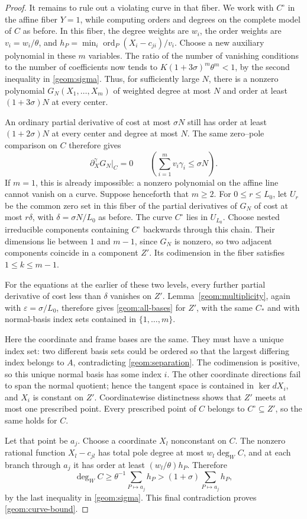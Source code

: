 \begin{proof}
It remains to rule out a violating curve in that fiber. We work with
$C^\circ$ in the affine fiber $Y=1$, while computing orders and degrees
on the complete model of $C$ as before. In this fiber, the degree weights
are $w_i$, the order weights are $v_i=w_i/\theta$,
and $h_P=\min_i\operatorname{ord}_P(X_i-c_{ji})/v_i$.
Choose a new auxiliary polynomial in these $m$ variables. The ratio of
the number of vanishing conditions to the number of coefficients now
tends to $K(1+3\sigma)^m\theta^m<1$, by the second inequality
in \eqref{geom:sigma}. Thus, for sufficiently large $N$, there is a
nonzero polynomial $G_N(X_1,\ldots,X_m)$ of weighted degree at most $N$
and order at least $(1+3\sigma)N$ at every center.

An ordinary partial derivative of cost at most $\sigma N$ still has
order at least $(1+2\sigma)N$ at every center and degree at most $N$.
The same zero--pole comparison on $C$ therefore gives
\[
 \partial_X^\gamma G_N\big|_C=0
 \qquad\left(\sum_{i=1}^m v_i\gamma_i\le\sigma N\right).
\]
If $m=1$, this is already impossible: a nonzero polynomial on the affine
line cannot vanish on a curve. Suppose henceforth that $m\ge2$. For
$0\le r\le L_0$, let $U_r$ be the common zero set in this fiber of the
partial derivatives of $G_N$ of cost at most $r\delta$, with
$\delta=\sigma N/L_0$ as before. The curve $C^\circ$ lies in $U_{L_0}$. Choose
nested irreducible components containing $C^\circ$ backwards through this
chain. Their dimensions lie between $1$ and $m-1$, since $G_N$ is
nonzero, so two adjacent components coincide in a component $Z'$.
Its codimension in the fiber satisfies $1\le k\le m-1$.

For the equations at the earlier of these two levels, every further
partial derivative of cost less than $\delta$ vanishes on $Z'$.
Lemma~\ref{geom:multiplicity}, again with $\varepsilon=\sigma/L_0$,
therefore gives \eqref{geom:all-bases} for $Z'$, with the same $C_*$
and with normal-basis index sets contained in $\{1,\ldots,m\}$.

Here the coordinate and frame bases are the same. They must have a
unique index set: two different basis sets could be ordered so that
the largest differing index belongs to $A$, contradicting
\eqref{geom:separation}. The codimension is positive, so this unique
normal basis has some index $i$. The other coordinate directions
fail to span the normal quotient; hence the tangent space is
contained in $\ker dX_i$, and $X_i$ is constant on $Z'$.
Coordinatewise distinctness shows that $Z'$ meets at most one prescribed
point. Every prescribed point of $C$ belongs to $C^\circ\subseteq Z'$,
so the same holds for $C$.

Let that point be $a_j$. Choose a coordinate $X_l$ nonconstant on
$C$. The nonzero rational function $X_l-c_{jl}$ has total pole degree
at most $w_l\deg_W C$, and at each branch through $a_j$ it has order
at least $(w_l/\theta)h_P$. Therefore
\[
 \deg_W C\ge\theta^{-1}\sum_{P\mapsto a_j}h_P
             >(1+\sigma)\sum_{P\mapsto a_j}h_P,
\]
by the last inequality in \eqref{geom:sigma}. This final contradiction
proves \eqref{geom:curve-bound}.
\end{proof}

